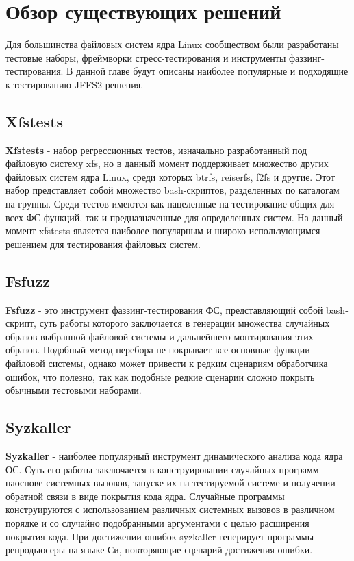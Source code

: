 \section{Обзор существующих решений}
\label{sec:Chapter2} 

Для большинства файловых систем ядра Linux сообществом были разработаны тестовые наборы, фреймворки стресс-тестирования и инструменты фаззинг-тестирования. В данной главе будут описаны наиболее популярные и подходящие к тестированию JFFS2 решения.

\subsection{Xfstests}

\textbf{Xfstests} \cite{xfstests} - набор регрессионных тестов, изначально разработанный под файловую систему xfs, но в данный момент поддерживает множество других файловых систем ядра Linux, среди которых btrfs, reiserfs, f2fs и другие. Этот набор представляет собой множество bash-скриптов, разделенных по каталогам на группы. Среди тестов имеются как нацеленные на тестирование общих для всех ФС функций, так и предназначенные для определенных систем. На данный момент xfstests является наиболее популярным и широко использующимся решением для тестирования файловых систем.

\subsection{Fsfuzz}

\textbf{Fsfuzz} \cite{fsfuzz}- это инструмент фаззинг-тестирования ФС, представляющий собой bash-скрипт, суть работы которого заключается в генерации множества случайных образов выбранной файловой системы и дальнейшего монтирования этих образов. Подобный метод перебора не покрывает все основные функции файловой системы, однако может привести к редким сценариям обработчика ошибок, что полезно, так как подобные редкие сценарии сложно покрыть обычными тестовыми наборами.

\subsection{Syzkaller}

\textbf{Syzkaller} \cite{syzkaller} - наиболее популярный инструмент динамического анализа кода ядра ОС. Суть его работы заключается в конструировании случайных программ наоснове системных вызовов, запуске их на тестируемой системе и получении обратной связи в виде покрытия кода ядра. Случайные программы конструируются с использованием различных системных вызовов в различном порядке и со случайно подобранными аргументами с целью расширения покрытия кода. При достижении ошибок syzkaller генерирует программы репродьюсеры на языке Си, повторяющие сценарий достижения ошибки.

